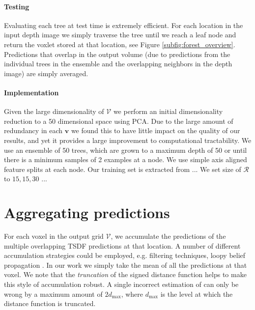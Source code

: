 \documentclass[10pt,twocolumn,letterpaper]{article}
\makeatletter
\renewcommand*{\eg}{e.g.\@\xspace}
\newcommand{\voxelgrid}{\mathcal{V}}
\makeatother
\begin{document}
\paragraph{Testing} 
Evaluating each tree at test time is extremely efficient. 
For each location in the input depth image we simply traverse the tree until we reach a leaf node and return the voxlet stored at that location, see Figure \ref{subfig:forest_overview}. 
Predictions that overlap in the output volume (due to predictions from the individual trees in the ensemble and the overlapping neighbors in the depth image) are simply averaged. 

\paragraph{Implementation} 
Given the large dimensionality of $\mathcal{V}$ we perform an initial dimensionality reduction to a 50 dimensional space using PCA.
Due to the large amount of redundancy in each $\mathbf{v}$ we found this to have little impact on the quality of our results, and yet it provides a large improvement to computational tractability.
We use an ensemble of 50 trees, which are grown to a maximum depth of 50 or until there is a minimum samples of 2 examples at a node. 
We use simple axis aligned feature splits at each node.
Our training set is extracted from ...
We set size of $\mathcal{R}$ to $15, 15, 30$ ...




\section{Aggregating predictions}
\label{sec:combining}

For each voxel in the output grid $\voxelgrid$, we accumulate the predictions of the multiple overlapping TSDF predictions at that location.
A number of different accumulation strategies could be employed, \eg filtering techniques, loopy belief propagation \etc.
In our work we simply take the mean of all the predictions at that voxel.
We note that the \emph{truncation} of the signed distance function helps to make this style of accumulation robust.
A single incorrect estimation of can only be wrong by a maximum amount of $2d_{\max}$, where $d_{\max}$ is the level at which the distance function is truncated.
\end{document}
